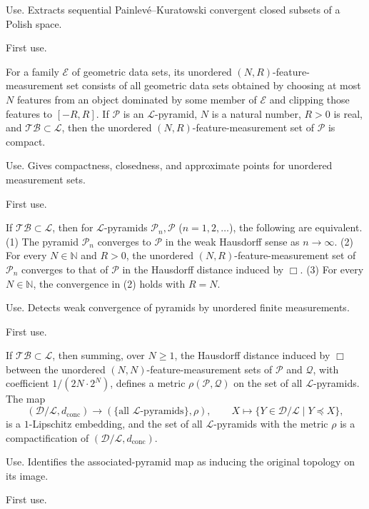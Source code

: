\documentclass{amsart}
\theoremstyle{plain}
\theoremstyle{definition}
\theoremstyle{remark}
\newcommand{\D}{\mathcal{D}}
\renewcommand{\L}{\mathcal{L}}
\newcommand{\TB}{\mathcal{TB}}
\newcommand{\dconc}{d_{\operatorname{conc}}}
\begin{document}
\begin{description}
\textup{Use.} Extracts sequential Painlev\'e--Kuratowski convergent closed subsets of a Polish space.

\textup{First use.} 

\item[\cite{gds2}, Lemma~7.1]
For a family $\mathcal E$ of geometric data sets, its unordered $(N,R)$-feature-measurement set consists of all geometric data sets obtained by choosing at most $N$ features from an object dominated by some member of $\mathcal E$ and clipping those features to $[-R,R]$. If $\mathcal P$ is an $\L$-pyramid, $N$ is a natural number, $R>0$ is real, and $\TB\subset\L$, then the unordered $(N,R)$-feature-measurement set of $\mathcal P$ is compact.

\textup{Use.} Gives compactness, closedness, and approximate points for unordered measurement sets.

\textup{First use.} 

\item[\cite{gds2}, Proposition~7.2]
If $\TB\subset\L$, then for $\L$-pyramids $\mathcal P_n,\mathcal P$ ($n=1,2,\ldots$), the following are equivalent. \textup{(1)} The pyramid $\mathcal P_n$ converges to $\mathcal P$ in the weak Hausdorff sense as $n\to\infty$. \textup{(2)} For every $N\in\mathbb N$ and $R>0$, the unordered $(N,R)$-feature-measurement set of $\mathcal P_n$ converges to that of $\mathcal P$ in the Hausdorff distance induced by $\Box$. \textup{(3)} For every $N\in\mathbb N$, the convergence in \textup{(2)} holds with $R=N$.

\textup{Use.} Detects weak convergence of pyramids by unordered finite measurements.

\textup{First use.} 

\item[\cite{gds2}, Proposition~7.3]
If $\TB\subset\L$, then summing, over $N\geq1$, the Hausdorff distance induced by $\Box$ between the unordered $(N,N)$-feature-measurement sets of $\mathcal P$ and $\mathcal Q$, with coefficient $1/(2N\cdot2^N)$, defines a metric $\rho(\mathcal P,\mathcal Q)$ on the set of all $\L$-pyramids. The map
\[
(\D/\L,\dconc)\longrightarrow(\{\text{all $\L$-pyramids}\},\rho),\qquad
X\longmapsto\{Y\in\D/\L\mid Y\preceq X\},
\]
is a $1$-Lipschitz embedding, and the set of all $\L$-pyramids with the metric $\rho$ is a compactification of $(\D/\L,\dconc)$.

\textup{Use.} Identifies the associated-pyramid map as inducing the original topology on its image.

\textup{First use.} 

\end{description}
\endgroup
\end{document}
